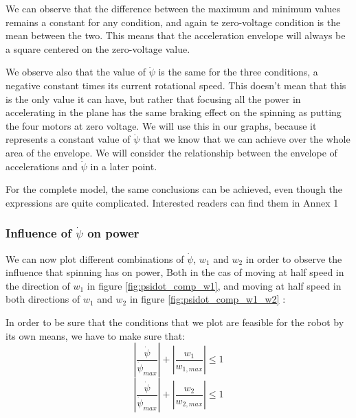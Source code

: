 \documentclass[12pt]{article}
\begin{document}
We can observe that the difference between the maximum and minimum values remains a constant for any condition, and again te zero-voltage condition is the mean between the two. This means that the acceleration envelope will always be a square centered on the zero-voltage value.

We observe also that the value of $\ddot \psi$ is the same for the three conditions, a negative constant times its current rotational speed. This doesn't mean that this is the only value it can have, but rather that focusing all the power in accelerating in the plane has the same braking effect on the spinning as putting the four motors at zero voltage. We will use this in our graphs, because it represents a constant value of $\ddot \psi$ that we know that we can achieve over the whole area of the envelope. We will consider the relationship between the envelope of accelerations and  $\ddot \psi$ in a later point.

For the complete model, the same conclusions can be achieved, even though  the expressions are quite complicated. Interested readers can find them in Annex 1 
\subsubsection{Influence of $\dot \psi$ on power}
We can now plot different combinations of $\dot \psi$, $w_1$ and $w_2$ in order to observe the influence that spinning has on power, Both in the cas of moving at half speed in the direction of $w_1$ in figure \ref{fig:psidot_comp_w1}, and moving at half speed in both directions of $w_1$ and $w_2$ in figure \ref{fig:psidot_comp_w1_w2} : 

In order to be sure that the conditions that we plot are feasible for the robot by its own means, we have to make sure that:
$$|\frac{\dot \psi}{\dot \psi_{max}}| + |\frac{w_1}{w_{1,max}}| \leq 1 $$
$$|\frac{\dot \psi}{\dot \psi_{max}}| + |\frac{w_2}{w_{2,max}}| \leq 1 $$
\end{document}
